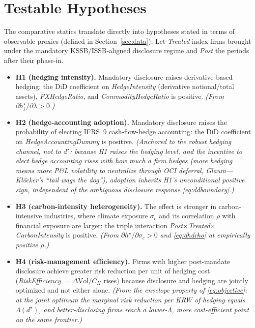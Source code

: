 \documentclass[11pt,a4paper]{article}
\begin{document}
\section{Testable Hypotheses}
\label{sec:hypotheses}

The comparative statics translate directly into hypotheses stated in terms of observable proxies (defined in Section~\ref{sec:data}). Let \emph{Treated} index firms brought under the mandatory KSSB/ISSB-aligned disclosure regime and \emph{Post} the periods after their phase-in.

\begin{itemize}
\item \textbf{H1 (hedging intensity).} Mandatory disclosure raises derivative-based hedging: the DiD coefficient on \emph{HedgeIntensity} (derivative notional/total assets), \emph{FXHedgeRatio}, and \emph{CommodityHedgeRatio} is positive. \emph{(From $\partial h_f^\star/\partial\lambda>0$.)}
\item \textbf{H2 (hedge-accounting adoption).} Mandatory disclosure raises the probability of electing IFRS~9 cash-flow-hedge accounting: the DiD coefficient on \emph{HedgeAccountingDummy} is positive. \emph{(Anchored to the robust hedging channel, not to $d^\star$: because H1 raises the hedging level, and the incentive to elect hedge accounting rises with how much a firm hedges (more hedging means more P\&L volatility to neutralize through OCI deferral, Glaum---Kl\"ocker's ``tail wags the dog''), adoption inherits H1's unconditional positive sign, independent of the ambiguous disclosure response \eqref{eq:ddboundary}.)}
\item \textbf{H3 (carbon-intensity heterogeneity).} The effect is stronger in carbon-intensive industries, where climate exposure $\sigma_c$ and its correlation $\rho$ with financial exposure are larger: the triple interaction \emph{Post$\times$Treated$\times$CarbonIntensity} is positive. \emph{(From $\partial h^\star/\partial\sigma_c>0$ and \eqref{eq:dhdrho} at empirically positive $\rho$.)}
\item \textbf{H4 (risk-management efficiency).} Firms with higher post-mandate disclosure achieve greater risk reduction per unit of hedging cost (\emph{RiskEfficiency} $=\Delta\mathrm{Vol}/C_H$ rises) because disclosure and hedging are jointly optimized and not either alone. \emph{(From the envelope property of \eqref{eq:objective}: at the joint optimum the marginal risk reduction per KRW of hedging equals $\Lambda(d^\star)$, and better-disclosing firms reach a lower-$\Lambda$, more cost-efficient point on the same frontier.)}

\end{itemize}
\end{document}

